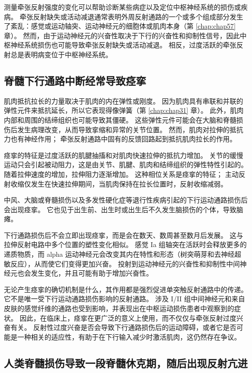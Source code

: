 测量牵张反射强度的变化可以帮助诊断某些病症以及定位中枢神经系统的损伤或疾病。 牵张反射缺失或活动减退通常表明外周反射通路的一个或多个组成部分发生了紊乱：感觉或运动轴突、运动神经元的细胞体或肌肉本身（第 \ref{chap:chap57} 章）。 然而，由于运动神经元的兴奋性取决于下行的兴奋性和抑制性信号，因此中枢神经系统损伤也可能导致牵张反射缺失或活动减退。 相反，过度活跃的牵张反射总是表明病变位于中枢神经系统。

\subsection{脊髓下行通路中断经常导致痉挛}
肌肉抵抗拉长的力量取决于肌肉的内在弹性或刚度。 因为肌肉具有串联和并联的弹性元件来抵抗延长，所以它表现得像弹簧（第 \ref{chap:chap31} 章）。 此外，肌肉内部和周围的结缔组织也可能导致其僵硬。 这些弹性元件可能会在大脑和脊髓损伤后发生病理改变，从而导致挛缩和异常的关节位置。 然而，肌肉对拉伸的抵抗力也有神经作用； 牵张反射通路中固有的反馈回路起到抵抗肌肉拉长的作用。

痉挛的特征是过度活跃的肌腱抽搐和对肌肉快速拉伸的抵抗力增加。 关节的缓慢运动只会引起被动阻力，这是由关节、肌腱、肌肉和结缔组织的弹性特性引起的。 随着拉伸速度的增加，拉伸阻力逐渐增加。 这种相位关系是痉挛的特征； 主动反射收缩仅发生在快速拉伸期间，当肌肉保持在拉长位置时，反射收缩减弱。

中风、大脑或脊髓损伤以及多发性硬化症等退行性疾病引起的下行运动通路损伤后会出现痉挛。 它也见于出生前、出生时或出生后不久发生脑损伤的个体，导致脑瘫。

下行通路损伤后不会立即出现痉挛，而是会在数天、数周甚至数月后发展。 这与拉伸反射电路中多个位置的塑性变化相似。 感觉 Ia 组轴突在活跃时会释放更多的递质物质，而 alpha 运动神经元会改变其内在特性和形态（树突萌芽和去神经超敏反应），从而使它们变得更加兴奋。 投射到运动神经元的兴奋性和抑制性中间神经元也会发生变化，并且可能有助于增加兴奋性。

无论产生痉挛的确切机制是什么，其作用都是强烈促进单突触反射通路中的传递。 它不是唯一受下行运动通路损伤影响的反射通路。 涉及 I/II 组中间神经元和来自皮肤的感觉纤维的通路也受到影响，并表现出在中枢运动损伤患者中观察到的症状。 因此，在临床上，痉挛在更广泛的意义上使用，而不仅仅与牵张反射过度兴奋有关。 反射性过度兴奋是否会导致下行通路损伤后的运动障碍，或者它是否可能是一种相关的适应性，有助于在下行输入减少时激活肌肉，这仍然存在争议。

\subsection{人类脊髓损伤导致一段脊髓休克期，随后出现反射亢进}

